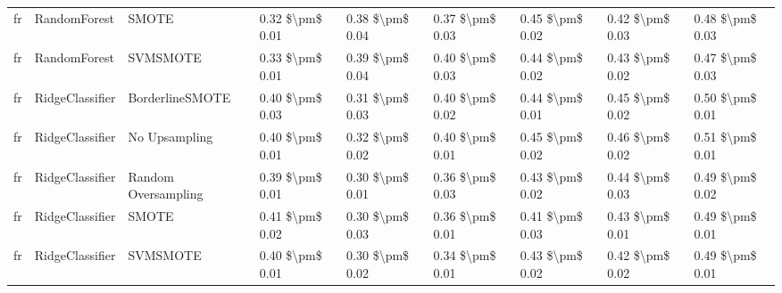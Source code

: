 \begin{tabular}{lllllllll}
      fr &                    RandomForest &                         SMOTE & 0.32 \$\textbackslash pm\$ 0.01 &           0.38 \$\textbackslash pm\$ 0.04 &       0.37 \$\textbackslash pm\$ 0.03 &        0.45 \$\textbackslash pm\$ 0.02 &                         0.42 \$\textbackslash pm\$ 0.03 &     0.48 \$\textbackslash pm\$ 0.03 \\
      fr &                    RandomForest &                      SVMSMOTE & 0.33 \$\textbackslash pm\$ 0.01 &           0.39 \$\textbackslash pm\$ 0.04 &       0.40 \$\textbackslash pm\$ 0.03 &        0.44 \$\textbackslash pm\$ 0.02 &                         0.43 \$\textbackslash pm\$ 0.02 &     0.47 \$\textbackslash pm\$ 0.03 \\
      fr &                 RidgeClassifier &               BorderlineSMOTE & 0.40 \$\textbackslash pm\$ 0.03 &           0.31 \$\textbackslash pm\$ 0.03 &       0.40 \$\textbackslash pm\$ 0.02 &        0.44 \$\textbackslash pm\$ 0.01 &                         0.45 \$\textbackslash pm\$ 0.02 &     0.50 \$\textbackslash pm\$ 0.01 \\
      fr &                 RidgeClassifier &                 No Upsampling & 0.40 \$\textbackslash pm\$ 0.01 &           0.32 \$\textbackslash pm\$ 0.02 &       0.40 \$\textbackslash pm\$ 0.01 &        0.45 \$\textbackslash pm\$ 0.02 &                         0.46 \$\textbackslash pm\$ 0.02 &     0.51 \$\textbackslash pm\$ 0.01 \\
      fr &                 RidgeClassifier &           Random Oversampling & 0.39 \$\textbackslash pm\$ 0.01 &           0.30 \$\textbackslash pm\$ 0.01 &       0.36 \$\textbackslash pm\$ 0.03 &        0.43 \$\textbackslash pm\$ 0.02 &                         0.44 \$\textbackslash pm\$ 0.03 &     0.49 \$\textbackslash pm\$ 0.02 \\
      fr &                 RidgeClassifier &                         SMOTE & 0.41 \$\textbackslash pm\$ 0.02 &           0.30 \$\textbackslash pm\$ 0.03 &       0.36 \$\textbackslash pm\$ 0.01 &        0.41 \$\textbackslash pm\$ 0.03 &                         0.43 \$\textbackslash pm\$ 0.01 &     0.49 \$\textbackslash pm\$ 0.01 \\
      fr &                 RidgeClassifier &                      SVMSMOTE & 0.40 \$\textbackslash pm\$ 0.01 &           0.30 \$\textbackslash pm\$ 0.02 &       0.34 \$\textbackslash pm\$ 0.01 &        0.43 \$\textbackslash pm\$ 0.02 &                         0.42 \$\textbackslash pm\$ 0.02 &     0.49 \$\textbackslash pm\$ 0.01 \\

\end{tabular}
